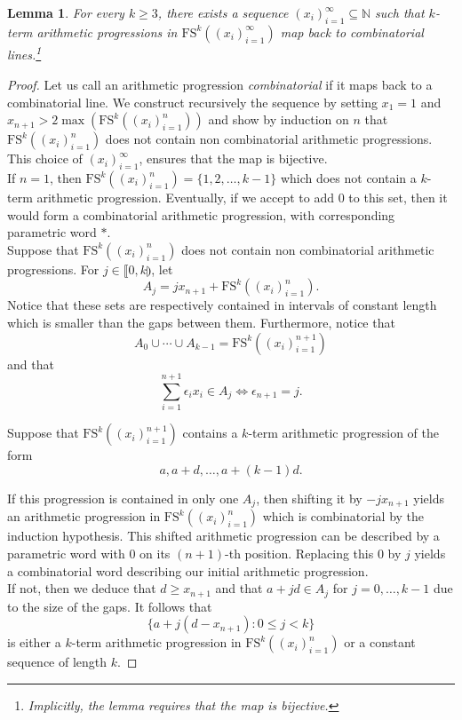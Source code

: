 \documentclass{article}
\theoremstyle{definition}
\theoremstyle{plain}
\newtheorem{lemma}[theorem]{Lemma}
\theoremstyle{remark}
\newcommand{\N}{\ensuremath{\mathbb{N}}}
\newcommand{\FS}[2][]{\ensuremath{\mathrm{FS}^{#1}\left(#2\right)}}
\newcommand{\seq}[2]{\ensuremath{\left ( {#1}_{#2}\right )_{#2 = 1}^\infty }}
\begin{document}
\begin{lemma}\label{combinatorialAP}
    For every $k\geq 3$, there exists a sequence $\seq{x}{i} \subseteq \N$ such that $k$-term arithmetic progressions in $\FS[k]{\seq{x}{i}}$ map back to combinatorial lines.\footnote{Implicitly, the lemma requires that the map is bijective.}
\end{lemma}
\begin{proof}
    Let us call an arithmetic progression \emph{combinatorial} if it maps back to a combinatorial line. We construct recursively the sequence by setting $x_1 = 1$ and $x_{n+1} > 2 \max \left (\FS[k]{(x_i)_{i=1}^n}\right )$ and show by induction on $n$ that $\FS[k]{(x_i)_{i=1}^n}$ does not contain non combinatorial arithmetic progressions. This choice of $\seq{x}{i}$, ensures that the map is bijective.\\

    If $n=1$, then $\FS[k]{(x_i)_{i=1}^n}= \{1,2,\ldots, k-1\}$ which does not contain a $k$-term arithmetic progression. Eventually, if we accept to add 0 to this set, then it would form a combinatorial arithmetic progression, with corresponding parametric word $*$.\\

    Suppose that $\FS[k]{(x_i)_{i=1}^n}$ does not contain non combinatorial arithmetic progressions. For $j \in \llbracket 0,k \rrparenthesis$, let 
    $$A_j = j x_{n+1} + \FS[k]{(x_i)_{i=1}^n}.$$
    Notice that these sets are respectively contained in intervals of constant length which is smaller than the gaps between them.
   Furthermore, notice that  $$A_0 \cup \cdots \cup A_{k-1} = \FS[k]{(x_i)_{i=1}^{n+1}}$$ and that 
    $$\sum_{i=1}^{n+1} \epsilon_i x_i \in A_j \iff \epsilon_{n+1}= j.$$ 
    
    Suppose that $\FS[k]{(x_i)_{i=1}^{n+1}}$ contains a $k$-term arithmetic progression of the form
    $$a, a+d , \ldots, a + (k-1)d.$$
    
    If this progression is contained in only one $A_j$, then shifting it by $-j x_{n+1}$ yields an arithmetic progression in $\FS[k]{(x_i)_{i=1}^{n}}$ which is combinatorial by the induction hypothesis. This shifted arithmetic progression can be described by a parametric word with $0$ on its $(n+1)$-th position. Replacing this 0 by $j$ yields a combinatorial word describing our initial arithmetic progression.\\

    If not, then we deduce that $d \geq x_{n+1}$ and that $a+ jd \in A_j$ for $j=0,\ldots,k-1$ due to the size of the gaps. It follows that 
    $$\{a+ j(d-x_{n+1}): 0 \leq j <k\}$$
    is either a $k$-term arithmetic progression in $\FS[k]{(x_i)_{i=1}^{n}}$ or a constant sequence of length $k$.
    

\end{proof}
\end{document}
